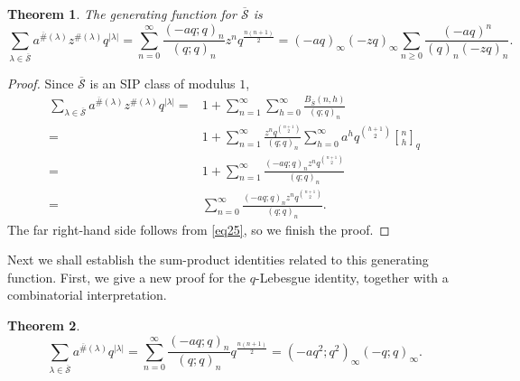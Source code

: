 \documentclass[12pt]{amsart}
\newtheorem{theorem}{Theorem}[section]
\theoremstyle{definition}
\theoremstyle{remark}
\numberwithin{equation}{section}
\begin{document}
\begin{theorem}\label{thm:GFStrictOverpartition}
The generating function for $\overline{\mathcal{S}}$ is \begin{equation}
\sum_{\lambda\in\overline{\mathcal{S}}}a^{\overline{\#}(\lambda)}z^{\#(\lambda)}q^{|\lambda|}=\sum_{n=0}^{\infty}\frac{(-aq;q)_{n}}{(q;q)_{n}}z^nq^{\frac{n(n+1)}{2}}=(-aq)_\infty (-zq)_\infty\sum_{n\ge 0}\dfrac{(-aq)^n}{(q)_n(-zq)_n}.
\end{equation}    
\end{theorem}
\begin{proof}
Since $\overline{\mathcal{S}}$ is an SIP class of modulus $1$,
\begin{align*}
\sum_{\lambda\in\overline{\mathcal{S}}}a^{\overline{\#}(\lambda)}z^{\#(\lambda)}q^{|\lambda|}=&1+\sum_{n=1}^{\infty}\sum_{h=0}^{\infty}\frac{B_{\overline{S}}(n,h)}{(q;q)_{n}}\\
=&1+\sum_{n=1}^{\infty}\frac{z^nq^{\binom{n+1}{2}}}{(q;q)_n}\sum_{h=0}^{\infty}a^{h}q^{\binom{h+1}{2}}{n\brack h}_{q}\\
=&1+\sum_{n=1}^{\infty}\frac{(-aq;q)_{n}z^nq^{\binom{n+1}{2}}}{(q;q)_n}\\
=&\sum_{n=0}^{\infty}\frac{(-aq;q)_{n}z^nq^{\binom{n+1}{2}}}{(q;q)_n}.
\end{align*}
The far right-hand side follows from \eqref{eq25}, so we finish the proof.
\end{proof}
Next we shall establish the sum-product identities related to this generating function. First, we give a new proof for the $q$-Lebesgue identity, together with a combinatorial interpretation.
\begin{theorem}\label{thm:NewQLebesgue}
\begin{equation}
\sum_{\lambda\in\overline{\mathcal{S}}}a^{\overline{\#}(\lambda)}q^{|\lambda|}=\sum_{n=0}^{\infty}\frac{(-aq;q)_{n}}{(q;q)_{n}}q^{\frac{n(n+1)}{2}}=(-aq^2;q^2)_{\infty}(-q;q)_{\infty}.
\end{equation}    
\end{theorem}
\end{document}
